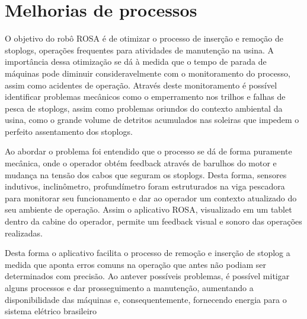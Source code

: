 \section{Melhorias de processos}
O objetivo do robô ROSA é de otimizar o processo de inserção e remoção de
stoplogs, operações frequentes para atividades de manutenção na usina. A
importância dessa otimização se dá à medida que o tempo de parada de máquinas
pode diminuir consideravelmente com o monitoramento do processo, assim como
acidentes de operação. Através deste monitoramento é possível identificar
problemas mecânicos como o emperramento nos trilhos e falhas de pesca de
stoplogs, assim como problemas oriundos do contexto ambiental da usina, como o
grande volume de detritos acumulados nas soleiras que impedem o perfeito
assentamento dos stoplogs.

Ao abordar o problema foi entendido que o processo se dá de forma puramente
mecânica, onde o operador obtém feedback através de barulhos do motor e mudança
na tensão dos cabos que seguram os stoplogs. Desta forma, sensores indutivos,
inclinômetro, profundímetro foram estruturados na viga pescadora para monitorar
seu funcionamento e dar ao operador um contexto atualizado do seu ambiente de
operação. Assim o aplicativo ROSA, visualizado em um tablet dentro da cabine do
operador, permite um feedback visual e sonoro das operações realizadas.

Desta forma o aplicativo facilita o processo de remoção e inserção de stoplog a
medida que aponta erros comuns na operação que antes não podiam ser determinados com
precisão. Ao antever possíveis problemas, é possível mitigar alguns processos e
dar prosseguimento a manutenção, aumentando a disponibilidade das máquinas e,
consequentemente, fornecendo energia para o sistema elétrico brasileiro
